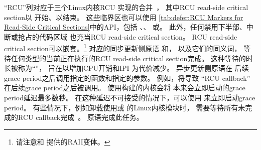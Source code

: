 ``RCU''列对应于三个Linux内核RCU
实现的合并~\cite{PaulEMcKenney2019RCUCVE,McKenney:2019:CRS:3319647.3325836}，
其中RCU read-side critical section以
开始、以结束。
这些临界区也可以使用
\cref{tab:defer:RCU Markers for Read-Side Critical Sections}中的API，包括
、、
或。
此外，任何禁用下半部、中断或抢占的代码区域
也充当RCU read-side critical section。
RCU read-side critical section可以嵌套。\footnote{
	请注意和
	提供的RAII变体。}
对应的同步更新侧原语
和，
以及它们的同义词，
等待任何类型的当前正在执行的RCU read-side critical section完成。
这种等待的时长被称为``''，
旨在以增加CPU开销和IPI
为代价减少。
异步更新侧原语在
后续grace period之后调用指定的函数和指定的参数。
例如，将导致
``RCU callback'' 在后续grace period之后被调用。
使用构建的内核会将
本来会立即启动的grace period延迟最多数秒。
在这种延迟不可接受的情况下，可以使用
来立即启动grace period。
有些情况下，例如卸载使用或
的Linux内核模块时，
需要等待所有未完成的RCU callback完成~\cite{PaulEMcKenney2007rcubarrier}。
原语完成此任务。

